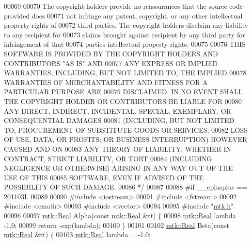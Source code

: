 \begin{DoxyCode}
00069 \textcolor{comment}{}
00070 \textcolor{comment}{The copyright holders provide no reassurances that the source code provided does}
00071 \textcolor{comment}{not infringe any patent, copyright, or any other intellectual property rights of}
00072 \textcolor{comment}{third parties. The copyright holders disclaim any liability to any recipient for}
00073 \textcolor{comment}{claims brought against recipient by any third party for infringement of that}
00074 \textcolor{comment}{parties intellectual property rights.}
00075 \textcolor{comment}{}
00076 \textcolor{comment}{THIS SOFTWARE IS PROVIDED BY THE COPYRIGHT HOLDERS AND CONTRIBUTORS "AS IS" AND}
00077 \textcolor{comment}{ANY EXPRESS OR IMPLIED WARRANTIES, INCLUDING, BUT NOT LIMITED TO, THE IMPLIED}
00078 \textcolor{comment}{WARRANTIES OF MERCHANTABILITY AND FITNESS FOR A PARTICULAR PURPOSE ARE}
00079 \textcolor{comment}{DISCLAIMED. IN NO EVENT SHALL THE COPYRIGHT HOLDER OR CONTRIBUTORS BE LIABLE FOR}
00080 \textcolor{comment}{ANY DIRECT, INDIRECT, INCIDENTAL, SPECIAL, EXEMPLARY, OR CONSEQUENTIAL DAMAGES}
00081 \textcolor{comment}{(INCLUDING, BUT NOT LIMITED TO, PROCUREMENT OF SUBSTITUTE GOODS OR SERVICES;}
00082 \textcolor{comment}{LOSS OF USE, DATA, OR PROFITS; OR BUSINESS INTERRUPTION) HOWEVER CAUSED AND ON}
00083 \textcolor{comment}{ANY THEORY OF LIABILITY, WHETHER IN CONTRACT, STRICT LIABILITY, OR TORT}
00084 \textcolor{comment}{(INCLUDING NEGLIGENCE OR OTHERWISE) ARISING IN ANY WAY OUT OF THE USE OF THIS}
00085 \textcolor{comment}{SOFTWARE, EVEN IF ADVISED OF THE POSSIBILITY OF SUCH DAMAGE.}
00086 \textcolor{comment}{*/}
00087 
00088 \textcolor{preprocessor}{#if \_\_cplusplus == 201103L}
00089 
00090 \textcolor{preprocessor}{#include <iostream>}
00091 \textcolor{preprocessor}{#include <fstream>}
00092 \textcolor{preprocessor}{#include <cmath>}
00093 \textcolor{preprocessor}{#include <vector>}
00094 
00095 \textcolor{preprocessor}{#include "\hyperlink{mtk_8h}{mtk.h}"}
00096 
00097 \hyperlink{group__c01-roots_gac080bbbf5cbb5502c9f00405f894857d}{mtk::Real} Alpha(\textcolor{keyword}{const} \hyperlink{group__c01-roots_gac080bbbf5cbb5502c9f00405f894857d}{mtk::Real} &tt) \{
00098   \hyperlink{group__c01-roots_gac080bbbf5cbb5502c9f00405f894857d}{mtk::Real} lambda = -1.0;
00099   \textcolor{keywordflow}{return} -exp(lambda);
00100 \}
00101 
00102 \hyperlink{group__c01-roots_gac080bbbf5cbb5502c9f00405f894857d}{mtk::Real} Beta(\textcolor{keyword}{const} \hyperlink{group__c01-roots_gac080bbbf5cbb5502c9f00405f894857d}{mtk::Real} &tt) \{
00103   \hyperlink{group__c01-roots_gac080bbbf5cbb5502c9f00405f894857d}{mtk::Real} lambda = -1.0;

\end{DoxyCode}

